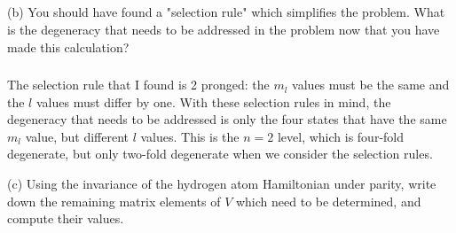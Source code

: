 \documentclass[12pt]{article}
\begin{document}
\subsection{}
(b) You should have found a "selection rule" which simplifies the problem. What is the degeneracy that needs to be addressed in the problem now that you have made this calculation?
\subsubsection{}
The selection rule that I found is 2 pronged: the $m_l$ values must be the same and the $l$ values must differ by one. With these selection rules in mind, the degeneracy that needs to be addressed is only the four states that have the same $m_l$ value, but different $l$ values. This is the $n = 2$ level, which is four-fold degenerate, but only two-fold degenerate when we consider the selection rules.

(c) Using the invariance of the hydrogen atom Hamiltonian under parity, write down the remaining matrix elements of $V$ which need to be determined, and compute their values.
\end{document}
